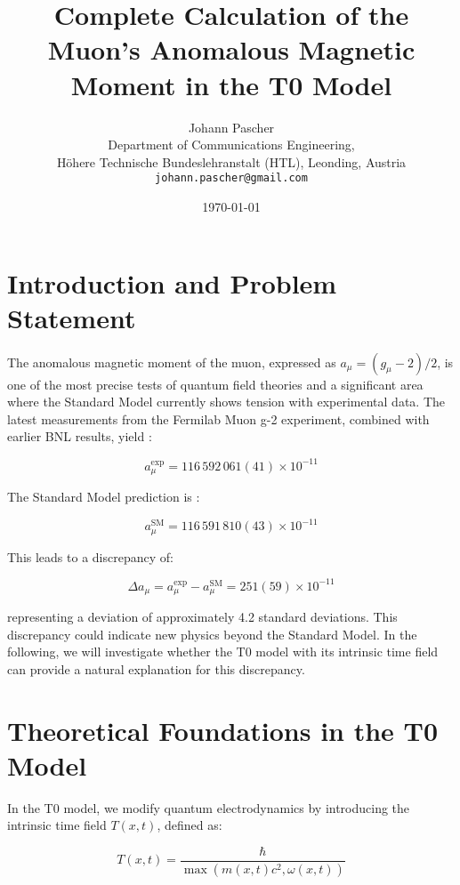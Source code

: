 \documentclass[12pt,a4paper]{article}
\title{Complete Calculation of the Muon's Anomalous Magnetic Moment in the T0 Model}
\author{Johann Pascher\\
	Department of Communications Engineering, \\Höhere Technische Bundeslehranstalt (HTL), Leonding, Austria\\
	\texttt{johann.pascher@gmail.com}}
\date{\today}
\begin{document}
	
	\maketitle
	
	\tableofcontents
	\newpage
	

	
	\section{Introduction and Problem Statement}
	
	The anomalous magnetic moment of the muon, expressed as $a_\mu = (g_\mu-2)/2$, is one of the most precise tests of quantum field theories and a significant area where the Standard Model currently shows tension with experimental data. The latest measurements from the Fermilab Muon g-2 experiment, combined with earlier BNL results, yield \cite{Muong-2:2021ojo}:
	
	\begin{equation}
		a_\mu^{\text{exp}} = 116\,592\,061(41) \times 10^{-11}
	\end{equation}
	
	The Standard Model prediction is \cite{Aoyama2020}:
	
	\begin{equation}
		a_\mu^{\text{SM}} = 116\,591\,810(43) \times 10^{-11}
	\end{equation}
	
	This leads to a discrepancy of:
	
	\begin{equation}
		\Delta a_\mu = a_\mu^{\text{exp}} - a_\mu^{\text{SM}} = 251(59) \times 10^{-11}
	\end{equation}
	
	representing a deviation of approximately 4.2 standard deviations. This discrepancy could indicate new physics beyond the Standard Model. In the following, we will investigate whether the T0 model with its intrinsic time field can provide a natural explanation for this discrepancy.
	
	\section{Theoretical Foundations in the T0 Model}
	
	In the T0 model, we modify quantum electrodynamics by introducing the intrinsic time field $T(x,t)$, defined as:
	
	\begin{equation}
		T(x,t) = \frac{\hbar}{\max(m(x,t)c^2, \omega(x,t))}
	\end{equation}
	
\end{document}
